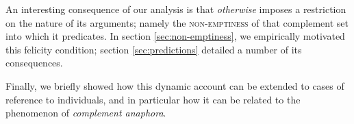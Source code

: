 An interesting consequence of our analysis is that \textit{otherwise} imposes a restriction on the nature of its arguments; namely the \textsc{non-emptiness} of that complement set into which it predicates. In section \ref{sec:non-emptiness}, we empirically motivated this felicity condition; section \ref{sec:predictions} detailed a number of its consequences.

%

Finally, we briefly showed how this dynamic account can be extended to cases of reference to individuals, and in particular how it can be related to the phenomenon of \textit{complement anaphora}. 











